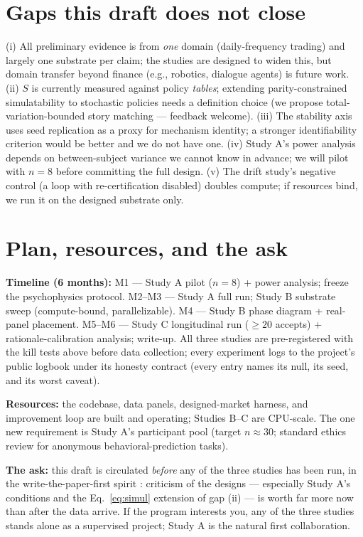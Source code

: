 \documentclass[11pt]{article}
\begin{document}
\section{Gaps this draft does not close}
\label{sec:gaps}

(i) All preliminary evidence is from \emph{one} domain (daily-frequency trading) and largely
one substrate per claim; the studies are designed to widen this, but domain transfer beyond
finance (e.g., robotics, dialogue agents) is future work. (ii) $S$ is currently measured
against policy \emph{tables}; extending parity-constrained simulatability to stochastic
policies needs a definition choice (we propose total-variation-bounded story matching ---
feedback welcome). (iii) The stability axis uses seed replication as a proxy for mechanism
identity; a stronger identifiability criterion would be better and we do not have one.
(iv) Study A's power analysis depends on between-subject variance we cannot know in advance;
we will pilot with $n{=}8$ before committing the full design. (v) The drift study's negative
control (a loop with re-certification disabled) doubles compute; if resources bind, we run it
on the designed substrate only.

\section{Plan, resources, and the ask}
\label{sec:plan}

\textbf{Timeline (6 months):} M1 --- Study A pilot ($n{=}8$) + power analysis; freeze the
psychophysics protocol. M2--M3 --- Study A full run; Study B substrate sweep (compute-bound,
parallelizable). M4 --- Study B phase diagram + real-panel placement. M5--M6 --- Study C
longitudinal run ($\ge 20$ accepts) + rationale-calibration analysis; write-up. All three
studies are pre-registered with the kill tests above before data collection; every experiment
logs to the project's public logbook under its honesty contract (every entry names its null,
its seed, and its worst caveat).

\textbf{Resources:} the codebase, data panels, designed-market harness, and improvement loop
are built and operating; Studies B--C are CPU-scale. The one new requirement is Study A's
participant pool (target $n \approx 30$; standard ethics review for anonymous
behavioral-prediction tasks).

\textbf{The ask:} this draft is circulated \emph{before} any of the three studies has been
run, in the write-the-paper-first spirit \citep{eisner-paper-first}: criticism of the designs
--- especially Study A's conditions and the Eq.~\ref{eq:simul} extension of gap (ii) --- is
worth far more now than after the data arrive. If the program interests you, any of the three
studies stands alone as a supervised project; Study A is the natural first collaboration.



\end{document}

